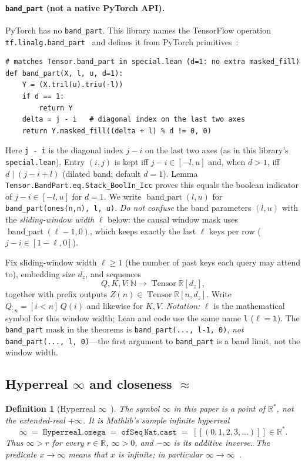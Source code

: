 \documentclass[11pt,a4paper]{article}
\newtheorem{definition}[theorem]{Definition}
\newcommand{\Tensor}{\operatorname{Tensor}}
\newcommand{\bandpart}{\operatorname{band\_part}}
\newcommand{\XEq}{\approx}
\newcommand{\Rstar}{\mathbb{R}^*}
\begin{document}
\paragraph{\texttt{band\_part} (not a native PyTorch API).}
PyTorch has no \texttt{band\_part}.
This library names the TensorFlow operation \texttt{tf.linalg.band\_part}~\cite{tensorflow_band_part} and defines it from PyTorch primitives~\cite{lemma_repo}:
\begin{verbatim}
# matches Tensor.band_part in special.lean (d=1: no extra masked_fill)
def band_part(X, l, u, d=1):
    Y = (X.tril(u).triu(-l))
    if d == 1:
        return Y
    delta = j - i   # diagonal index on the last two axes
    return Y.masked_fill((delta + l) % d != 0, 0)
\end{verbatim}
\noindent
Here \texttt{j - i} is the diagonal index $j-i$ on the last two axes (as in this library's \texttt{special.lean}).
Entry $(i,j)$ is kept iff $j-i\in[-l,u]$ and, when $d>1$, iff $d\mid(j-i+l)$ (dilated band; default $d=1$).
Lemma \texttt{Tensor.BandPart.eq.Stack\_BoolIn\_Icc} proves this equals the boolean indicator of $j-i\in[-l,u]$ for $d=1$.
We write $\bandpart(l,u)$ for \texttt{band\_part(ones(n,n), l, u)}.
\emph{Do not confuse} the band parameters $(l,u)$ with the \emph{sliding-window width} $\ell$ below: the causal window mask uses $\bandpart(\ell-1,0)$, which keeps exactly the last $\ell$ keys per row ($j-i\in[1-\ell,0]$).

Fix sliding-window width $\ell\ge 1$ (the number of past keys each query may attend to), embedding size $d_z$, and sequences
\[
Q,K,V:\mathbb{N}\to\Tensor\mathbb{R}[d_z],
\]
together with prefix outputs $Z(n)\in\Tensor\mathbb{R}[n,d_z]$.
Write $Q_{:n}=[i<n]\,Q(i)$ and likewise for $K,V$.
\emph{Notation:} $\ell$ is the mathematical symbol for this window width; Lean and code use the same name \texttt{l} ($\ell=\texttt{l}$).
The \texttt{band\_part} mask in the theorems is \texttt{band\_part(..., l-1, 0)}, \emph{not} \texttt{band\_part(..., l, 0)}---the first argument to \texttt{band\_part} is a band limit, not the window width.

\subsection{Hyperreal \texorpdfstring{$\infty$}{infinity} and closeness \texorpdfstring{$\XEq$}{approx}}

\begin{definition}[Hyperreal $\infty$~\cite{mathlib_hyperreal}]
\label{def:infty}
The symbol $\infty$ in this paper is a point of $\Rstar$, not the extended-real $+\infty$.
It is Mathlib's sample infinite hyperreal
\[
\infty \;=\; \mathtt{Hyperreal.omega}
\;=\; \mathtt{ofSeq}\,\mathtt{Nat.cast}
\;=\; [\![(0,1,2,3,\ldots)]\!]
\in\Rstar.
\]
Thus $\infty>r$ for every $r\in\mathbb{R}$, $\infty>0$, and $-\infty$ is its additive inverse.
The predicate $x\to\infty$ means that $x$ is infinite; in particular $\infty\to\infty$~\cite{lemma_infty}.
\end{definition}
\end{document}
